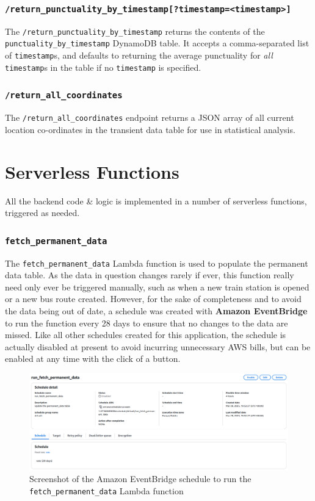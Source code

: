 \documentclass[a4paper,11pt]{report}
\begin{document}
\subsubsection{\texttt{/return\_punctuality\_by\_timestamp[?timestamp=<timestamp>]}}
The \verb|/return_punctuality_by_timestamp| returns the contents of the \verb|punctuality_by_timestamp| DynamoDB table.
It accepts a comma-separated list of \verb|timestamp|s, and defaults to returning the average punctuality for \textit{all} \verb|timestamp|s in the table if no \verb|timestamp| is specified. 

\subsubsection{\texttt{/return\_all\_coordinates}}
The \verb|/return_all_coordinates| endpoint returns a JSON array of all current location co-ordinates in the transient data table for use in statistical analysis.

\section{Serverless Functions}
All the backend code \& logic is implemented in a number of serverless functions, triggered as needed.

\subsubsection{\texttt{fetch_permanent_data}}
The \verb|fetch_permanent_data| Lambda function is used to populate the permanent data table.
As the data in question changes rarely if ever, this function really need only ever be triggered manually, such as when a new train station is opened or a new bus route created.
However, for the sake of completeness and to avoid the data being out of date, a schedule was created with \textbf{Amazon EventBridge} to run the function every 28 days to ensure that no changes to the data are missed.
Like all other schedules created for this application, the schedule is actually disabled at present to avoid incurring unnecessary AWS bills, but can be enabled at any time with the click of a button.

\begin{figure}[H]
    \centering
    \includegraphics[width=\textwidth]{./images/fetch_permanent_data_schedule.png}
    \caption{Screenshot of the Amazon EventBridge schedule to run the \texttt{fetch_permanent_data} Lambda function}
\end{figure}
\end{document}
